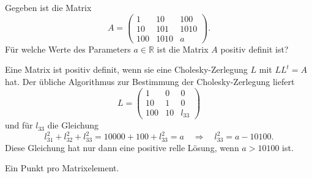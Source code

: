 Gegeben ist die Matrix
\[
A=\begin{pmatrix}
  1&   10&  100\\
 10&  101& 1010\\
100& 1010&  a
\end{pmatrix}.
\]
Für welche Werte des Parameters $a\in\mathbb R$ ist die Matrix
$A$ positiv definit ist?

\begin{loesung}
Eine Matrix ist positiv definit, wenn sie eine Cholesky-Zerlegung $L$ mit
$LL^t=A$ hat.
Der übliche Algorithmus zur Bestimmung der Cholesky-Zerlegung liefert
\[
L=\begin{pmatrix}
1&0&0\\
10&1&0\\
100&10&l_{33}
\end{pmatrix}
\]
und für $l_{33}$ die Gleichung
\[
l_{31}^2 + l_{32}^2 + l_{33}^2 = 10000 + 100 + l_{33}^2 = a
\quad\Rightarrow\quad
l_{33}^2 = a - 10100.
\]
Diese Gleichung hat nur dann eine positive relle Lösung, wenn $a > 10100$ ist.
\end{loesung}

\begin{bewertung}
Ein Punkt pro Matrixelement.
\end{bewertung}
